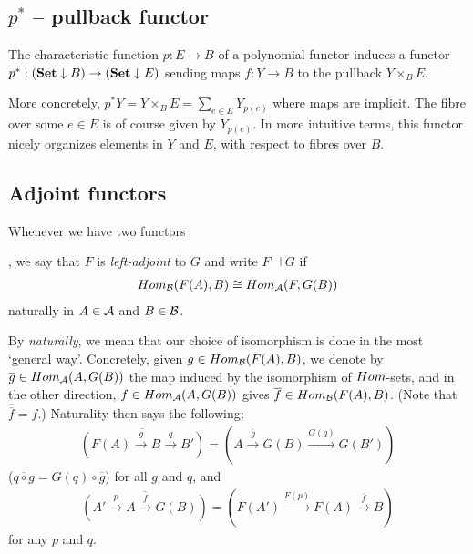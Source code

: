 \subsection{$p^*$ -- pullback functor}

The characteristic function $p:E\to B$ of a polynomial functor induces a functor $p^*:(\mathbf{Set}\downarrow B)\to(\mathbf{Set}\downarrow E)$ sending maps $f:Y\to B$ to the pullback $Y\times_B E$.

More concretely, $p^* Y = Y\times_B E = \sum_{e\in E} Y_{p(e)}$ where maps are implicit. The fibre over some $e\in E$ is of course given by $Y_{p(e)}$. In more intuitive terms, this functor nicely organizes elements in $Y$ and $E$, with respect to fibres over $B$.


\subsection{Adjoint functors}

\begin{definition}
	Whenever we have two functors
	,
	we say that $F$ is \emph{left-adjoint} to $G$ and write $F \dashv G$ if
	\begin{align*}
		Hom_{\mathcal{B}}(F(A),B) \cong Hom_{\mathcal{A}}(F,G(B))
	\end{align*}
	naturally in $A\in\mathcal{A}$ and $B\in\mathcal{B}$.
\end{definition}

By \emph{naturally}, we mean that our choice of isomorphism is done in the most `general way'. Concretely, given $g\in Hom_{\mathcal{B}}(F(A),B)$, we denote by $\overline{g}\in Hom_{\mathcal{A}}(A,G(B))$ the map induced by the isomorphism of $Hom$-sets, and in the other direction, $f\in Hom_{\mathcal{A}}(A,G(B))$ gives $\overline{f}\in Hom_{\mathcal{B}}(F(A),B)$. (Note that $\overline{\overline{f}}=f$.) Naturality then says the following;
\begin{align*}
	\overline{\left(F(A) \overset{g}{\longrightarrow} B \overset{q}{\longrightarrow} B'\right)} = \left( A \overset{\overline{g}}{\longrightarrow} G(B) \overset{G(q)}{\longrightarrow} G(B') \right)
\end{align*} ($\overline{q\circ g} = G(q)\circ\overline{g}$) for all $g$ and $q$, and
\begin{align*}
	\overline{\left( A' \overset{p}{\longrightarrow} A \overset{f}{\longrightarrow} G(B) \right)} = \left( F(A') \overset{F(p)}{\longrightarrow} F(A) \overset{\overline{f}}{\longrightarrow} B \right)
\end{align*}
for any $p$ and $q$.

